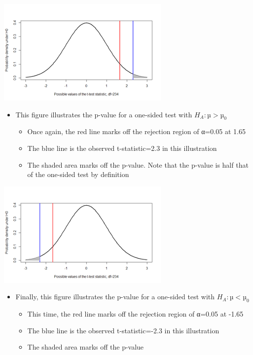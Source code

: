 \documentclass[
]{book}
\providecommand{\tightlist}{%
  \setlength{\itemsep}{0pt}\setlength{\parskip}{0pt}}
\begin{document}
\includegraphics[width=0.5\linewidth]{./4_27}

\begin{itemize}
\tightlist
\item
  This figure illustrates the p-value for a one-sided test with \(H_A: µ > µ_0\)

  \begin{itemize}
  \tightlist
  \item
    Once again, the red line marks off the rejection region of α=0.05 at 1.65
  \item
    The blue line is the observed t-statistic=2.3 in this illustration
  \item
    The shaded area marks off the p-value. Note that the p-value is half that of the one-sided test by definition
  \end{itemize}
\end{itemize}

\includegraphics[width=0.5\linewidth]{./4_28}

\begin{itemize}
\tightlist
\item
  Finally, this figure illustrates the p-value for a one-sided test with \(H_A: µ < µ_0\)

  \begin{itemize}
  \tightlist
  \item
    This time, the red line marks off the rejection region of α=0.05 at -1.65
  \item
    The blue line is the observed t-statistic=-2.3 in this illustration
  \item
    The shaded area marks off the p-value
  \end{itemize}
\end{itemize}
\end{document}
